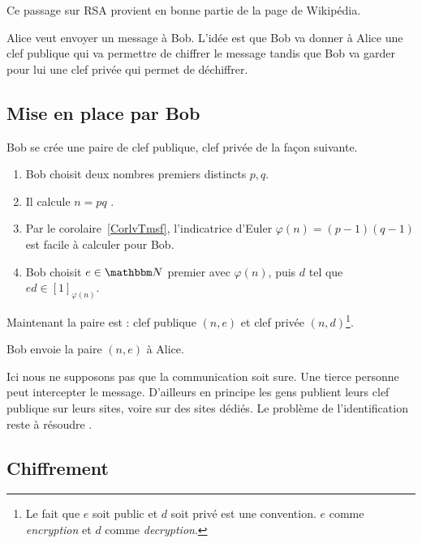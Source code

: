 Ce passage sur RSA provient en bonne partie de la page de Wikipédia\cite{ooRIFDooNxOehF}.

Alice veut envoyer un message à Bob. L'idée est que Bob va donner à Alice une clef publique qui va permettre de chiffrer le message tandis que Bob va garder pour lui une clef privée qui permet de déchiffrer.

\subsection{Mise en place par Bob}

Bob se crée une paire de clef publique, clef privée de la façon suivante.
\begin{enumerate}
    \item
        Bob choisit deux nombres premiers distincts \( p,q\).
    \item
        Il calcule \( n=pq\) .
    \item
        Par le corolaire~\ref{CorlvTmsf}, l'indicatrice d'Euler \( \varphi(n)=(p-1)(q-1)\) est facile à calculer pour Bob.
    \item
        Bob choisit \( e\in \eN\) premier avec \( \varphi(n)\), puis \( d\) tel que \( ed\in[1]_{\varphi(n)}\).
\end{enumerate}
Maintenant la paire est : clef publique \( (n,e)\) et clef privée \( (n,d)\)\footnote{Le fait que \( e\) soit public et \( d\) soit privé est une convention. \( e\) comme  \emph{encryption} et \( d\) comme \emph{decryption}.}.

Bob envoie la paire \( (n,e)\) à Alice.

\begin{remark}
    Ici nous ne supposons pas que la communication soit sure. Une tierce personne peut intercepter le message. D'ailleurs en principe les gens publient leurs clef publique sur leurs sites, voire sur des sites dédiés. Le problème de l'identification reste à résoudre .
\end{remark}

\subsection{Chiffrement}

